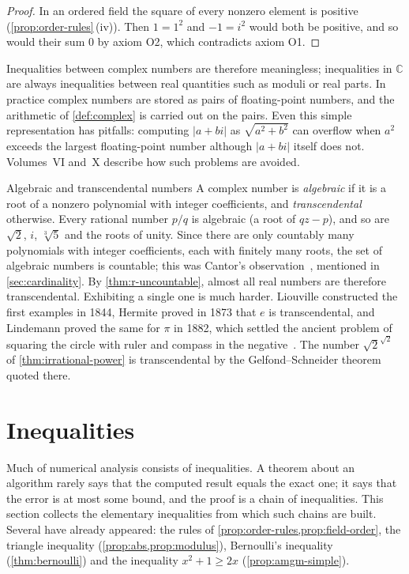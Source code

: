\begin{proof}
In an ordered field the square of every nonzero element is positive (\cref{prop:order-rules}\,(iv)). Then $1=1^2$ and $-1=i^2$ would both be positive, and so would their sum $0$ by axiom O2, which contradicts axiom O1.
\end{proof}

Inequalities between complex numbers are therefore meaningless; inequalities in $\mathbb C$ are always inequalities between real quantities such as moduli or real parts. In practice complex numbers are stored as pairs of floating-point numbers, and the arithmetic of \cref{def:complex} is carried out on the pairs. Even this simple representation has pitfalls: computing $|a+bi|$ as $\sqrt{a^2+b^2}$ can overflow when $a^2$ exceeds the largest floating-point number although $|a+bi|$ itself does not. Volumes~VI and~X describe how such problems are avoided.

\begin{note}{Algebraic and transcendental numbers}
A complex number is \emph{algebraic} if it is a root of a nonzero polynomial with integer coefficients, and \emph{transcendental} otherwise. Every rational number $p/q$ is algebraic (a root of $qz-p$), and so are $\sqrt2$, $i$, $\sqrt[3]{5}$ and the roots of unity. Since there are only countably many polynomials with integer coefficients, each with finitely many roots, the set of algebraic numbers is countable; this was Cantor's observation~\cite{cantor1874}, mentioned in \cref{sec:cardinality}. By \cref{thm:r-uncountable}, almost all real numbers are therefore transcendental. Exhibiting a single one is much harder. Liouville constructed the first examples in 1844, Hermite proved in 1873 that $e$ is transcendental, and Lindemann proved the same for $\pi$ in 1882, which settled the ancient problem of squaring the circle with ruler and compass in the negative~\cite{baker1975,hardywright2008}. The number $\sqrt2^{\sqrt2}$ of \cref{thm:irrational-power} is transcendental by the Gelfond--Schneider theorem quoted there.
\end{note}

\section{Inequalities}
\label{sec:inequalities}

Much of numerical analysis consists of inequalities. A theorem about an algorithm rarely says that the computed result equals the exact one; it says that the error is at most some bound, and the proof is a chain of inequalities. This section collects the elementary inequalities from which such chains are built. Several have already appeared: the rules of \cref{prop:order-rules,prop:field-order}, the triangle inequality (\cref{prop:abs,prop:modulus}), Bernoulli's inequality (\cref{thm:bernoulli}) and the inequality $x^2+1\ge2x$ (\cref{prop:amgm-simple}).

